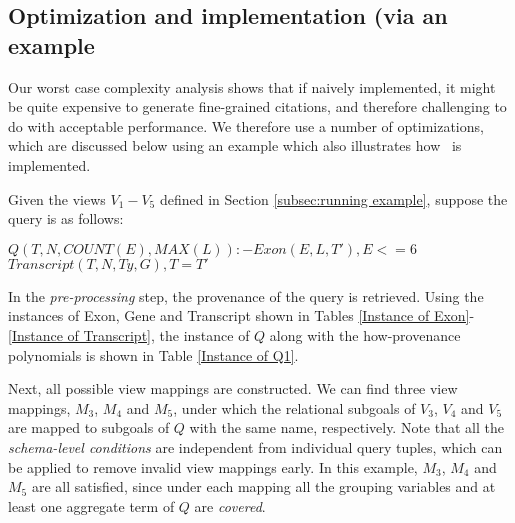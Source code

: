 \subsection{Optimization and implementation (via an example}
Our worst case complexity analysis shows that if naively implemented, it might be quite expensive to generate fine-grained citations, and therefore challenging to do with acceptable performance.  We therefore use a number of optimizations, which are discussed below using an example which also illustrates how \provalg\ is implemented. 
\begin{example}
Given the views $V_1-V_5$ defined in Section \ref{subsec:running example}, suppose the query is as follows:
\begin{tabbing}
$Q(T, N, COUNT(E), MAX(L)):-Exon(E, L, T'), E <= 6$\\
\tab\tab\tab\tab$Transcript(T, N, Ty, G), T = T'$
\end{tabbing}
In the {\em pre-processing} step,  the provenance of the query is retrieved. Using the instances of Exon, Gene and Transcript shown in Tables \ref{Instance of Exon}-\ref{Instance of Transcript}, the instance of $Q$ along with the how-provenance polynomials is shown in Table \ref{Instance of Q1}. 

Next, all possible view mappings are constructed. We can find three view mappings, $M_3$, $M_4$ and $M_5$, under which the relational subgoals of $V_3$, $V_4$ and $V_5$ are mapped to subgoals of $Q$ with the same name, respectively. Note that all the {\em schema-level conditions} are independent from individual query tuples, which can be applied to remove invalid view mappings early. In this example, $M_3$, $M_4$ and $M_5$ are all satisfied, since under each mapping all the grouping variables and at least one aggregate term of $Q$ are {\em covered}.


\end{example}
